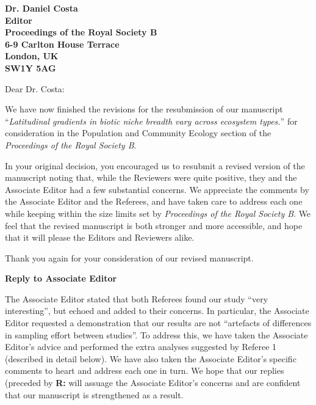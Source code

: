\documentclass[12pt]{letter}
\newcommand{\mytitle}{\emph{Latitudinal gradients in biotic niche breadth vary across ecosystem types.}}
\newcommand{\myjournal}{\emph{Proceedings of the Royal Society B}}
\begin{document}
\begin{letter}{\bf Dr. Daniel Costa\\
               Editor\\
               Proceedings of the Royal Society B\\
               6-9 Carlton House Terrace\\
               London, UK\\
               SW1Y 5AG\\
                }

\opening{Dear Dr. Costa:}

We have now finished the revisions for the resubmission of our manuscript
``\mytitle'' for consideration in the Population and Community Ecology section
of the \myjournal. 

In your original decision, you encouraged us to resubmit a revised version of
the manuscript noting that, while the Reviewers were quite positive, they and
the Associate Editor had a few substantial concerns. We appreciate the
comments by the Associate Editor and the Referees, and have taken care to
address each one while keeping within the size limits set by \myjournal. We
feel that the revised manuscript is both stronger and more accessible, and
hope that it will please the Editors and Reviewers alike.


Thank you again for your consideration of our revised manuscript.



\end{letter}

\newpage

\setcounter{page}{1}


{\Large \bf Reply to Associate Editor}

  The Associate Editor stated that both Referees found our study ``very
  interesting'', but echoed and added to their concerns. In particular, the
  Associate Editor requested a demonstration that our results are not
  ``artefacts of differences in sampling effort between studies''. To address
  this, we have taken the Associate Editor's advice and performed the extra
  analyses suggested by Referee 1 (described in detail below). We have also
  taken the Associate Editor's specific comments to heart and address each one
  in turn. We hope that our replies (preceded by \textbf{R:} 
  will assuage the Associate Editor's concerns and are 
  confident that our manuscript is strengthened as a result.
\end{document}
